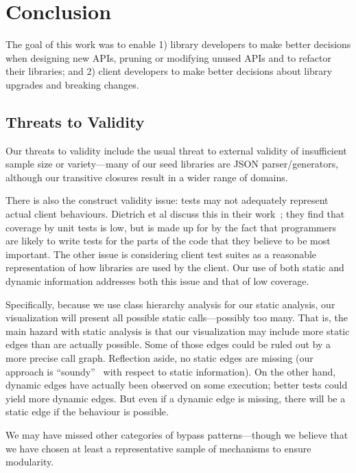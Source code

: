 \chapter{Conclusion}
\label{sec:conclusion}
The goal of this work was to enable 1) library developers to make better
decisions when designing new APIs, pruning or modifying unused APIs and to refactor their
libraries; and 2) client developers to make better decisions about library
upgrades and breaking changes.

\section{Threats to Validity}
Our threats to validity include the usual threat to external validity
of insufficient sample size or variety---many of our seed libraries
are JSON parser/generators, although our transitive closures result in
a wider range of domains.

There is also the construct validity issue: tests may
not adequately represent actual client behaviours. 
Dietrich et al discuss this in their work~\cite{dietrich2017construction}; 
they find that coverage by unit tests is low, 
but is made up for by the fact that programmers are likely to write tests for the parts of the code
that they believe to be most important. 
The other issue is considering client test suites as a reasonable representation of how libraries are used by the client.
Our use of both static and dynamic information addresses both this issue and that of low coverage. 

Specifically, because we use
class hierarchy analysis for our static analysis, our visualization will present
all possible static calls---possibly too many. 
That is, the main hazard with static analysis is that our visualization may include more
static edges than are actually possible. Some of those edges could be ruled out by a more
precise call graph. Reflection aside, no static edges
are missing (our approach is ``soundy''~\cite{livshits15:_in_defen_sound} with respect to static information). 
On the other hand, dynamic edges have actually been observed
on some execution; better tests could yield more dynamic edges. But even if
a dynamic edge is missing, there will be a static edge if the behaviour is possible.

We may have missed other categories of bypass patterns---though we believe
that we have chosen at least a representative sample of mechanisms to ensure
modularity. 

